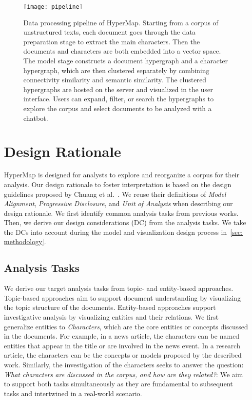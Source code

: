 \begin{figure*}[htbp]
 \centering %
 \texttt{[image: pipeline]}
 \caption{Data processing pipeline of HyperMap. 
 Starting from a corpus of unstructured texts, each document goes through the data preparation stage to extract the main characters.
 Then the documents and characters are both embedded into a vector space.
 The model stage constructs a document hypergraph and a character hypergraph, which are then clustered separately by combining connectivity similarity and semantic similarity.
 The clustered hypergraphs are hosted on the server and visualized in the user interface.
 Users can expand, filter, or search the hypergraphs to explore the corpus and select documents to be analyzed with a chatbot.
  }\label{fig:pipeline}
\end{figure*}

\section{Design Rationale}\label{sec: design_rationale}
HyperMap is designed for analysts to explore and reorganize a corpus for their analysis.
Our design rationale to foster interpretation is based on the design guidelines proposed by Chuang et al.~\cite{chuang2012interpretation}.
We reuse their definitions of \textit{Model Alignment}, \textit{Progressive Disclosure}, and \textit{Unit of Analysis} when describing our design rationale.
We first identify common analysis tasks from previous works.
Then, we derive our design considerations (DC) from the analysis tasks.
We take the DCs into account during the model and visualization design process in~\autoref{sec: methodology}.

\subsection{Analysis Tasks}
We derive our target analysis tasks from topic- and entity-based approaches.
Topic-based approaches aim to support document understanding by visualizing the topic structure of the documents.
Entity-based approaches support investigative analysis by visualizing entities and their relations.
We first generalize entities to \textit{Characters}, which are the core entities or concepts discussed in the documents.
For example, in a news article, the characters can be named entities that appear in the title or are involved in the news event.
In a research article, the characters can be the concepts or models proposed by the described work.
Similarly, the investigation of the characters seeks to answer the question: \textit{What characters are discussed in the corpus, and how are they related?}: 
We aim to support both tasks simultaneously as they are fundamental to subsequent tasks and intertwined in a real-world scenario.

